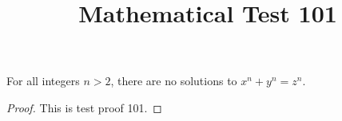 \documentclass{amsart}
\begin{document}
\title{Mathematical Test 101}
\begin{theorem}
For all integers $n > 2$, there are no solutions to $x^n + y^n = z^n$.
\end{theorem}
\begin{proof}
This is test proof 101.
\end{proof}
\end{document}
